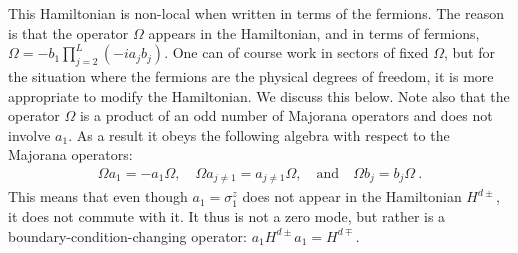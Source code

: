 \documentclass[11pt]{article}
\newcommand{\comment}[1]{{}}
\numberwithin{equation}{section}		%
\begin{document}
This Hamiltonian is non-local when written in terms of the fermions. The reason is that the operator $\Omega$ appears in the Hamiltonian, and in terms of fermions, $\Omega = - b_1 \prod_{j = 2}^L (-ia_j b_j)$. One can of course work in sectors of fixed $\Omega$, but for the situation where the fermions are the physical degrees of freedom, it is more appropriate to modify the Hamiltonian. We discuss this below.
Note also that the operator $\Omega$ is a product of an odd number of Majorana operators and does not involve $a_1$. As a result it obeys the following algebra with respect to the Majorana operators:
\begin{align}
\Omega a_1 = -a_1 \Omega,\quad \Omega a_{j\neq1} =  a_{j\neq1} \Omega, \quad \text{and} \quad \Omega b_j = b_j \Omega\ .
\end{align}
This means that even though $a_1=\sigma^z_1$ does not appear in the Hamiltonian $H^{d\pm}$, it does not commute with it. It thus is not a zero mode, but rather is a boundary-condition-changing operator: $a_1H^{d\pm}a_1= H^{d\mp}$.
\comment{
An eigenstate $\ket{\psi_{\pm}, \omega}$ of $H^{d\pm}$ and $\Omega$, with eigenvalues $E^{d\pm}$ and $\omega$ respectively, therefore obeys
\begin{align}
H^{d \mp} a_1 \ket{\psi_{\pm}, \omega} &=a_1 H^{d \pm}a_1 a_1 \ket{\psi_{\pm}, \omega}  = E^{d \pm} a_1 \ket{\psi_{\pm}, \omega},  \\
\Omega a_1 \ket{\psi_{\pm}, \omega} &= - \omega a_1\ket{\psi_{\pm}, \omega} .
\end{align}
Therefore $a_1=\sigma^z_1$ identifies states of $H^{d\pm}$ with charge $\omega$ and states of $H^{d\mp}$ of charge $-\omega$.
}
\end{document}
